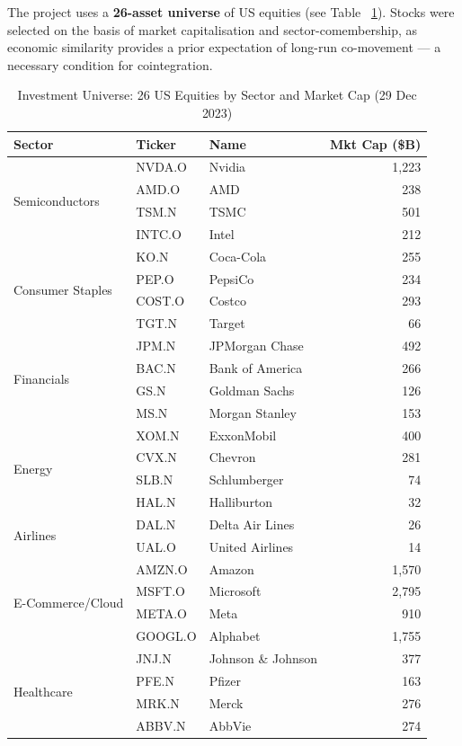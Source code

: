 \documentclass[a4paper]{report}
\begin{document}
The project uses a \textbf{26-asset universe} of US equities (see Table ~\ref{tab:universe}). Stocks were selected on the basis of market capitalisation and sector-comembership, as economic similarity provides a prior expectation of long-run co-movement --- a necessary condition for cointegration. 

\begin{table}[htbp]
\centering
\caption{Investment Universe: 26 US Equities by Sector and Market Cap (29 Dec 2023)}
\label{tab:universe}
\footnotesize
\begin{tabular}{lllr}
\toprule
\textbf{Sector} & \textbf{Ticker} & \textbf{Name} & \textbf{Mkt Cap (\$B)} \\
\midrule
\multirow{4}{*}{Semiconductors}
  & NVDA.O  & Nvidia        & 1,223 \\
  & AMD.O   & AMD           & 238   \\
  & TSM.N   & TSMC          & 501   \\
  & INTC.O  & Intel         & 212   \\
\midrule
\multirow{4}{*}{Consumer Staples}
  & KO.N    & Coca-Cola     & 255   \\
  & PEP.O   & PepsiCo       & 234   \\
  & COST.O  & Costco        & 293   \\
  & TGT.N   & Target        & 66    \\
\midrule
\multirow{4}{*}{Financials}
  & JPM.N   & JPMorgan Chase& 492   \\
  & BAC.N   & Bank of America& 266  \\
  & GS.N    & Goldman Sachs & 126   \\
  & MS.N    & Morgan Stanley& 153   \\
\midrule
\multirow{4}{*}{Energy}
  & XOM.N   & ExxonMobil    & 400   \\
  & CVX.N   & Chevron       & 281   \\
  & SLB.N   & Schlumberger  & 74    \\
  & HAL.N   & Halliburton   & 32    \\
\midrule
\multirow{2}{*}{Airlines}
  & DAL.N   & Delta Air Lines & 26  \\
  & UAL.O   & United Airlines & 14  \\
\midrule
\multirow{4}{*}{E-Commerce/Cloud}
  & AMZN.O  & Amazon        & 1,570 \\
  & MSFT.O  & Microsoft     & 2,795 \\
  & META.O  & Meta          & 910   \\
  & GOOGL.O & Alphabet      & 1,755 \\
\midrule
\multirow{4}{*}{Healthcare}
  & JNJ.N   & Johnson \& Johnson & 377 \\
  & PFE.N   & Pfizer        & 163   \\
  & MRK.N   & Merck         & 276   \\
  & ABBV.N  & AbbVie        & 274   \\
\bottomrule
\end{tabular}
\end{table}
\end{document}
